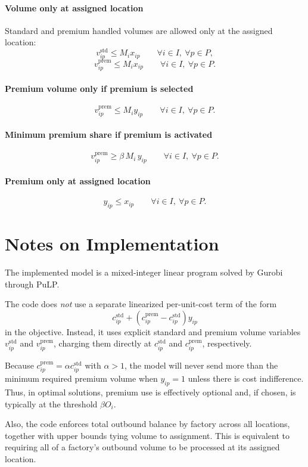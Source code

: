 \paragraph{Volume only at assigned location}
Standard and premium handled volumes are allowed only at the assigned location:
\[
v^{\mathrm{std}}_{ip} \le M_i x_{ip}
\qquad \forall i \in I,\ \forall p \in P,
\]
\[
v^{\mathrm{prem}}_{ip} \le M_i x_{ip}
\qquad \forall i \in I,\ \forall p \in P.
\]

\paragraph{Premium volume only if premium is selected}
\[
v^{\mathrm{prem}}_{ip} \le M_i y_{ip}
\qquad \forall i \in I,\ \forall p \in P.
\]

\paragraph{Minimum premium share if premium is activated}
\[
v^{\mathrm{prem}}_{ip} \ge \beta\, M_i\, y_{ip}
\qquad \forall i \in I,\ \forall p \in P.
\]

\paragraph{Premium only at assigned location}
\[
y_{ip} \le x_{ip}
\qquad \forall i \in I,\ \forall p \in P.
\]

\section*{Notes on Implementation}

The implemented model is a mixed-integer linear program solved by Gurobi through PuLP.

The code does \emph{not} use a separate linearized per-unit-cost term of the form
\[
c^{\mathrm{std}}_{ip} + \left(c^{\mathrm{prem}}_{ip} - c^{\mathrm{std}}_{ip}\right) y_{ip}
\]
in the objective. Instead, it uses explicit standard and premium volume variables $v^{\mathrm{std}}_{ip}$ and $v^{\mathrm{prem}}_{ip}$, charging them directly at $c^{\mathrm{std}}_{ip}$ and $c^{\mathrm{prem}}_{ip}$, respectively.

Because $c^{\mathrm{prem}}_{ip} = \alpha c^{\mathrm{std}}_{ip}$ with $\alpha > 1$, the model will never send more than the minimum required premium volume when $y_{ip}=1$ unless there is cost indifference. Thus, in optimal solutions, premium use is effectively optional and, if chosen, is typically at the threshold $\beta O_i$.

Also, the code enforces total outbound balance by factory across all locations, together with upper bounds tying volume to assignment. This is equivalent to requiring all of a factory's outbound volume to be processed at its assigned location.
